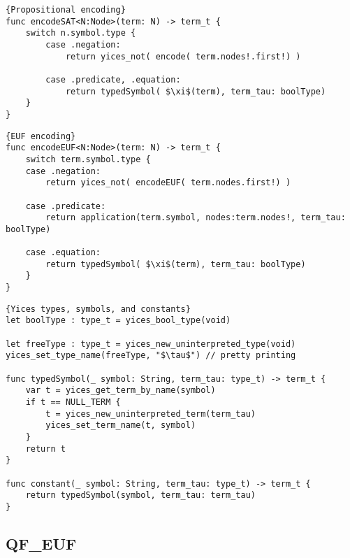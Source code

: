 
\begin{lstlisting}[language=FLEA]{Propositional encoding}
func encodeSAT<N:Node>(term: N) -> term_t {
	switch n.symbol.type {
		case .negation:
			return yices_not( encode( term.nodes!.first!) )
		
		case .predicate, .equation:
			return typedSymbol( $\xi$(term), term_tau: boolType)
	}	
}
\end{lstlisting}

\begin{lstlisting}[language=FLEA]{EUF encoding}
func encodeEUF<N:Node>(term: N) -> term_t {
	switch term.symbol.type {
	case .negation:
		return yices_not( encodeEUF( term.nodes.first!) )

	case .predicate:
		return application(term.symbol, nodes:term.nodes!, term_tau: boolType)
		
	case .equation:
		return typedSymbol( $\xi$(term), term_tau: boolType)
	}	
}
\end{lstlisting}


\begin{lstlisting}[language=flea]{Yices types, symbols, and constants}
let boolType : type_t = yices_bool_type(void)

let freeType : type_t = yices_new_uninterpreted_type(void)
yices_set_type_name(freeType, "$\tau$") // pretty printing

func typedSymbol(_ symbol: String, term_tau: type_t) -> term_t {
	var t = yices_get_term_by_name(symbol)
	if t == NULL_TERM {
		t = yices_new_uninterpreted_term(term_tau)
		yices_set_term_name(t, symbol)
	}
	return t
}

func constant(_ symbol: String, term_tau: type_t) -> term_t {
	return typedSymbol(symbol, term_tau: term_tau)
}
\end{lstlisting}




\subsection{QF\_EUF}


